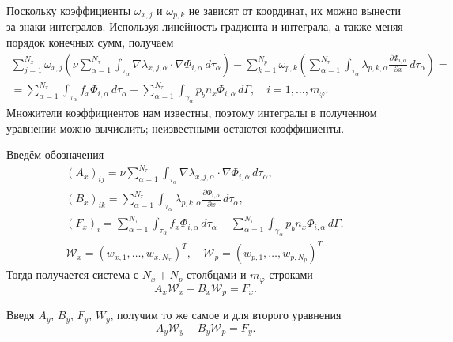 \documentclass[a4paper,14pt]{extarticle}
\begin{document}
Поскольку коэффициенты $\omega_{x,j}$ и $\omega_{p,k}$
не зависят от координат, их можно вынести за знаки
интегралов. Используя линейность градиента и интеграла,
а также меняя порядок конечных сумм, получаем
\begin{equation}
	\begin{gathered}
		\sum_{j=1}^{N_x}
		\omega_{x,j}
		\left(
			\nu\sum_{\alpha=1}^{N_\tau}
			\int_{\tau_\alpha}
			\nabla\lambda_{x,j,\alpha}
			\cdot\nabla\Phi_{i,\alpha}
			\,d\tau_\alpha
		\right)
		-
		\sum_{k=1}^{N_p}
		\omega_{p,k}
		\left(
			\sum_{\alpha=1}^{N_\tau}
			\int_{\tau_\alpha}
			\lambda_{p,k,\alpha}
			\frac{\partial\Phi_{i,\alpha}}{\partial x}
			\,d\tau_\alpha
		\right)
		=
		\\
		=
		\sum_{\alpha=1}^{N_\tau}
		\int_{\tau_\alpha}
		f_x\Phi_{i,\alpha}\,d\tau_\alpha
		-
		\sum_{\alpha=1}^{N_\tau}
		\int_{\gamma_\alpha}
		p_b n_x\Phi_{i,\alpha}\,d\Gamma,
		\quad i=1,\ldots,m_\varphi.
	\end{gathered}
\end{equation}
Множители коэффициентов нам известны, поэтому интегралы в полученном
уравнении можно вычислить; неизвестными остаются
коэффициенты.

Введём обозначения
\begin{equation}
	\begin{gathered}
		(A_x)_{ij}
		=
		\nu\sum_{\alpha=1}^{N_\tau}
		\int_{\tau_\alpha}
		\nabla\lambda_{x,j,\alpha}
		\cdot\nabla\Phi_{i,\alpha}\,d\tau_\alpha,
		\\
		(B_x)_{ik}
		=
		\sum_{\alpha=1}^{N_\tau}
		\int_{\tau_\alpha}
		\lambda_{p,k,\alpha}
		\frac{\partial\Phi_{i,\alpha}}{\partial x}
		\,d\tau_\alpha,
		\\
		(F_x)_i
		=
		\sum_{\alpha=1}^{N_\tau}
		\int_{\tau_\alpha}
		f_x\Phi_{i,\alpha}\,d\tau_\alpha
		-
		\sum_{\alpha=1}^{N_\tau}
		\int_{\gamma_\alpha}
		p_b n_x\Phi_{i,\alpha}\,d\Gamma,\\
		\mathcal{W}_{x} = (w_{x,1},\dots,w_{x,N_x})^T,\quad
		\mathcal{W}_{p} = (w_{p,1},\dots,w_{p,N_p})^T
	\end{gathered}
\end{equation}
Тогда получается система с $N_x + N_p$ столбцами и $m_\varphi$ строками
\begin{equation}
	A_x\mathcal{W}_x - B_x\mathcal{W}_p   = F_x.
\end{equation}


Введя $A_y$, $B_y$, $F_y$, $W_y$,  получим то же самое и для второго уравнения
\begin{equation}
	A_y\mathcal W_y-B_y\mathcal W_p=F_y.
\end{equation}
\end{document}
